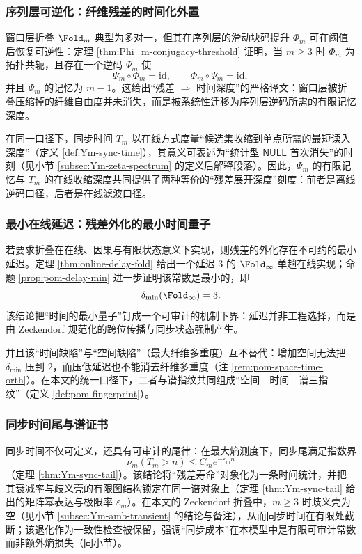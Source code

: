 \subsubsection{序列层可逆化：纤维残差的时间化外置}\label{subsubsec:frt-sequence-inversion}
窗口层折叠 \(\Fold_m\) 典型为多对一，但其在序列层的滑动块码提升 \(\Phi_m\) 可在阈值后恢复可逆性：定理 \ref{thm:Phi_m-conjugacy-threshold} 证明，当 \(m\ge 3\) 时 \(\Phi_m\) 为拓扑共轭，且存在一个逆码 \(\Psi_m\) 使
\[
\Psi_m\circ\Phi_m=\mathrm{id},\qquad \Phi_m\circ\Psi_m=\mathrm{id},
\]
并且 \(\Psi_m\) 的记忆为 \(m-1\)。这给出“残差 \(\Rightarrow\) 时间深度”的严格译文：窗口层被折叠压缩掉的纤维自由度并未消失，而是被系统性迁移为序列层逆码所需的有限记忆深度。\par
在同一口径下，同步时间 \(T_m\) 以在线方式度量“候选集收缩到单点所需的最短读入深度”（定义 \ref{def:Ym-sync-time}），其意义可表述为“统计型 \(\mathsf{NULL}\) 首次消失”的时刻（见小节 \ref{subsec:Ym-zeta-spectrum} 的定义后解释段落）。因此，\(\Psi_m\) 的有限记忆与 \(T_m\) 的在线收缩深度共同提供了两种等价的“残差展开深度”刻度：前者是离线逆码口径，后者是在线滤波口径。

\subsubsection{最小在线延迟：残差外化的最小时间量子}\label{subsubsec:frt-min-online-delay}
若要求折叠在在线、因果与有限状态意义下实现，则残差的外化存在不可约的最小延迟。定理 \ref{thm:online-delay-fold} 给出一个延迟 \(3\) 的 \(\Fold_\infty\) 单趟在线实现；命题 \ref{prop:pom-delay-min} 进一步证明该常数是最小的，即
\[
\delta_{\min}(\Fold_\infty)=3.
\]
该结论把“时间的最小量子”钉成一个可审计的机制下界：延迟并非工程选择，而是由 Zeckendorf 规范化的跨位传播与同步状态强制产生。\par
并且该“时间缺陷”与“空间缺陷”（最大纤维多重度）互不替代：增加空间无法把 \(\delta_{\min}\) 压到 \(2\)，而压低延迟也不能消去纤维多重度（注 \ref{rem:pom-space-time-orth}）。在本文的统一口径下，二者与谱指纹共同组成“空间—时间—谱三指纹”（定义 \ref{def:pom-fingerprint}）。

\subsubsection{同步时间尾与谱证书}\label{subsubsec:frt-sync-tail-spectrum}
同步时间不仅可定义，还具有可审计的尾律：在最大熵测度下，同步尾满足指数界
\[
\nu_m(T_m>n)\le C_m e^{-\varepsilon_m n}
\]
（定理 \ref{thm:Ym-sync-tail}）。该结论将“残差寿命”对象化为一条时间统计，并把其衰减率与歧义壳的有限图结构锁定在同一谱对象上（定理 \ref{thm:Ym-sync-tail} 给出的矩阵幂表达与极限率 \(\varepsilon_m\)）。在本文的 Zeckendorf 折叠中，\(m\ge 3\) 时歧义壳为空（见小节 \ref{subsec:Ym-amb-transient} 的结论与备注），从而同步时间在有限处截断；该退化作为一致性检查被保留，强调“同步成本”在本模型中是有限可审计常数而非额外熵损失（同小节）。

